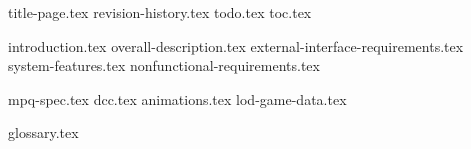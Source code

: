 \documentclass[oneside, openany]{scrbook}
\begin{document}
\frontmatter
{title-page.tex}
{revision-history.tex}
{todo.tex} %
{toc.tex} %

\mainmatter
{introduction.tex}
{overall-description.tex}
{external-interface-requirements.tex}
{system-features.tex}
{nonfunctional-requirements.tex}

\begin{appendices}
	{mpq-spec.tex}
	{dcc.tex}
	{animations.tex}
	{lod-game-data.tex}
\end{appendices}

\backmatter
{glossary.tex}
\end{document}
